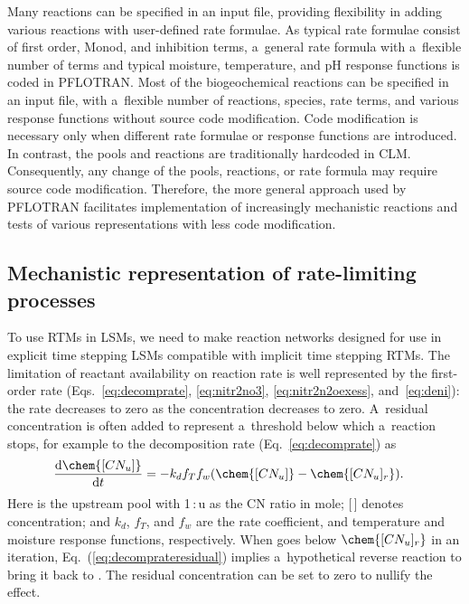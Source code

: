 \documentclass[gmdd, online, hvmath]{copernicus}
\begin{document}
      Many reactions can be specified in an input file, providing
      flexibility in adding various reactions with user-defined rate
      formulae. As typical rate formulae consist of first order, Monod, and
      inhibition terms, a~general rate formula with a~flexible number of
      terms and typical moisture, temperature, and pH response functions is
      coded in PFLOTRAN. Most of the biogeochemical reactions can be
      specified in an input file, with a~flexible number of reactions,
      species, rate terms, and various response functions without source
      code modification.  Code modification is necessary only when different
      rate formulae or response functions are introduced. In contrast, the
        pools and reactions are traditionally hardcoded in
      CLM. Consequently, any change of the pools, reactions, or rate formula
      may require source code modification. Therefore, the more general
      approach used by PFLOTRAN facilitates implementation of increasingly
      mechanistic reactions and tests of various representations with less
      code modification.


\subsection{Mechanistic representation of rate-limiting processes}%

      To use RTMs in LSMs, we need to make reaction networks designed for
      use in explicit time stepping LSMs compatible with implicit time
      stepping RTMs. The limitation of reactant availability on reaction
      rate is well represented by the first-order rate
      (Eqs.~\ref{eq:decomprate}, \ref{eq:nitr2no3}, \ref{eq:nitr2n2oexess},
      and~\ref{eq:deni}): the rate decreases to zero as the concentration
      decreases to zero. A~residual concentration  is often
      added to represent a~threshold below which a~reaction stops, for
      example to the decomposition rate (Eq.~\ref{eq:decomprate}) as
\begin{align}
 &
\frac{\mathrm{d} \chem{[CN_u]}}{\mathrm{d} t} =
-k_{d} f_{T} f_{w} (\chem{[CN_u]} - \chem{[CN_u]_r}).
\label{eq:decomprateresidual}
\end{align}%
      Here  is the upstream pool with 1\,:\,u as the CN ratio in
      mole; [\,] denotes concentration; and $k_{d}$, $f_{T}$, and
      $f_{w}$ are the rate coefficient, and temperature and moisture response
      functions, respectively. When  goes below
      $\chem{[CN_u]_r}$ in an iteration,
      Eq.~(\ref{eq:decomprateresidual}) implies a~hypothetical reverse
      reaction to bring it back to . The residual
      concentration can be set to zero to nullify the effect.
\end{document}
